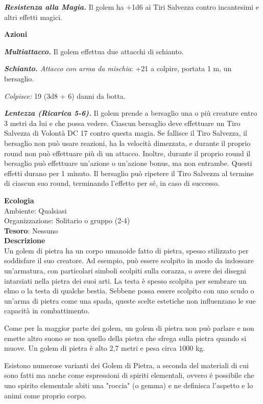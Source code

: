 \begin{multicols}{2}
\textit{\textbf{Resistenza alla Magia.}} Il golem ha +1d6 ai Tiri Salvezza contro incantesimi e altri effetti magici.

\textbf{Azioni}

\textit{\textbf{Multiattacco.}} Il golem effettua due attacchi di schianto.

\textit{\textbf{Schianto.} Attacco con arma da mischia}: +21 a colpire, portata 1 m, un bersaglio.

\textit{Colpisce:} 19 (3d8 + 6) danni da botta.

\textit{\textbf{Lentezza (Ricarica 5-6).}} Il golem prende a bersaglio una o più creature entro 3 metri da lui e che possa vedere. Ciascun bersaglio deve effettuare un Tiro Salvezza di Volontà DC 17 contro questa magia. Se fallisce il Tiro Salvezza, il bersaglio non può usare reazioni, ha la velocità dimezzata, e durante il proprio round non può effettuare più di un attacco. Inoltre, durante il proprio round il bersaglio può effettuare un'azione o un'azione bonus, ma non entrambe. Questi effetti durano per 1 minuto. Il bersaglio può ripetere il Tiro Salvezza al termine di ciascun suo round, terminando l'effetto per sé, in caso di successo.

\textbf{Ecologia}\\
Ambiente: Qualsiasi\\
Organizzazione: Solitario o gruppo (2-4)\\
\textbf{Tesoro}: Nessuno\\
\textbf{Descrizione}\\
Un golem di pietra ha un corpo umanoide fatto di pietra, spesso stilizzato per soddisfare il suo creatore. Ad esempio, può essere scolpito in modo da indossare un'armatura, con particolari simboli scolpiti sulla corazza, o avere dei disegni intarsiati nella pietra dei suoi arti. La testa è spesso scolpita per sembrare un elmo o la testa di qualche bestia. Sebbene possa essere scolpito con uno scudo o un'arma di pietra come una spada, queste scelte estetiche non influenzano le sue capacità in combattimento.

Come per la maggior parte dei golem, un golem di pietra non può parlare e non emette altro suono se non quello della pietra che sfrega sulla pietra quando si muove. Un golem di pietra è alto 2,7 metri e pesa circa 1000 kg.

Esistono numerose varianti dei Golem di Pietra, a seconda del materiali di cui sono fatti ma anche come espressioni di spiriti elementali, ovvero é possibile che uno spirito elementale abiti una "roccia" (o gemma) e ne definisca l'aspetto e lo animi come proprio corpo.


\end{multicols}

